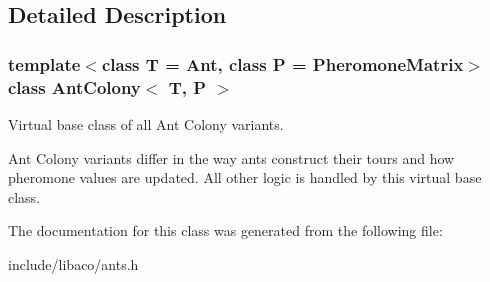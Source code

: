 \subsection{Detailed Description}
\subsubsection*{template$<$class T = Ant, class P = PheromoneMatrix$>$ class AntColony$<$ T, P $>$}

Virtual base class of all Ant Colony variants. 

Ant Colony variants differ in the way ants construct their tours and how pheromone values are updated. All other logic is handled by this virtual base class. 

The documentation for this class was generated from the following file:\begin{CompactItemize}
\item 
include/libaco/ants.h\end{CompactItemize}
